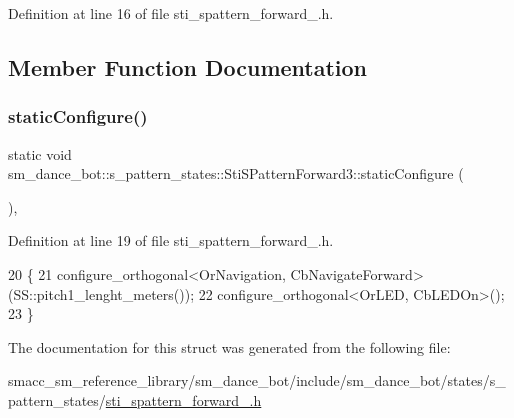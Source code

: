 Definition at line 16 of file sti\+\_\+spattern\+\_\+forward\+\_.\+h.



\subsection{Member Function Documentation}
\mbox{\label{structsm__dance__bot_1_1s__pattern__states_1_1StiSPatternForward3_a95b52e8147aa4169010fa9bc00ea63e0}} 
\subsubsection{\texorpdfstring{static\+Configure()}{staticConfigure()}}
{\footnotesize\ttfamily static void sm\+\_\+dance\+\_\+bot\+::s\+\_\+pattern\+\_\+states\+::\+Sti\+S\+Pattern\+Forward3\+::static\+Configure (\begin{DoxyParamCaption}{ }\end{DoxyParamCaption})\hspace{0.3cm}{\ttfamily [inline]}, {\ttfamily [static]}}



Definition at line 19 of file sti\+\_\+spattern\+\_\+forward\+\_.\+h.


\begin{DoxyCode}
20   \{
21     configure\_orthogonal<OrNavigation, CbNavigateForward>(SS::pitch1\_lenght\_meters());
22     configure\_orthogonal<OrLED, CbLEDOn>();
23   \}
\end{DoxyCode}


The documentation for this struct was generated from the following file\+:\begin{DoxyCompactItemize}
\item 
smacc\+\_\+sm\+\_\+reference\+\_\+library/sm\+\_\+dance\+\_\+bot/include/sm\+\_\+dance\+\_\+bot/states/s\+\_\+pattern\+\_\+states/\hyperlink{include_2sm__dance__bot_2states_2s__pattern__states_2sti__spattern__forward__3_8h}{sti\+\_\+spattern\+\_\+forward\+\_.\+h}\end{DoxyCompactItemize}
